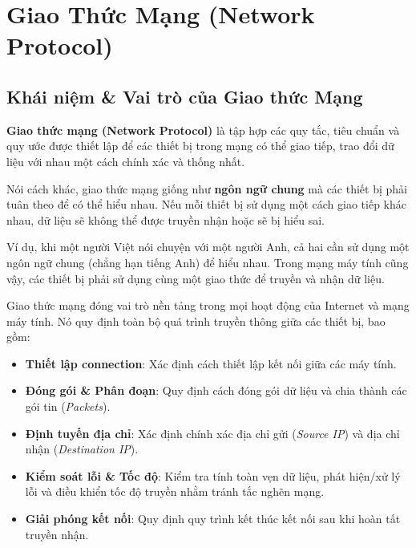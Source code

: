 \documentclass[11pt,oneside]{book}
\newcommand{\term}[1]{\textbf{\textcolor{primaryBlue}{#1}}}
\begin{document}
\section{Giao Thức Mạng (Network Protocol)}
\label{sec:protocols}

\subsection{Khái niệm \& Vai trò của Giao thức Mạng}

\term{Giao thức mạng (Network Protocol)} là tập hợp các quy tắc, tiêu chuẩn và quy ước được thiết lập để các thiết bị trong mạng có thể giao tiếp, trao đổi dữ liệu với nhau một cách chính xác và thống nhất.

Nói cách khác, giao thức mạng giống như \textbf{ngôn ngữ chung} mà các thiết bị phải tuân theo để có thể hiểu nhau. Nếu mỗi thiết bị sử dụng một cách giao tiếp khác nhau, dữ liệu sẽ không thể được truyền nhận hoặc sẽ bị hiểu sai.

Ví dụ, khi một người Việt nói chuyện với một người Anh, cả hai cần sử dụng một ngôn ngữ chung (chẳng hạn tiếng Anh) để hiểu nhau. Trong mạng máy tính cũng vậy, các thiết bị phải sử dụng cùng một giao thức để truyền và nhận dữ liệu.

Giao thức mạng đóng vai trò nền tảng trong mọi hoạt động của Internet và mạng máy tính. Nó quy định toàn bộ quá trình truyền thông giữa các thiết bị, bao gồm:
\begin{itemize}[leftmargin=2.2em, itemsep=2pt, parsep=0pt]
    \item \textbf{Thiết lập connection}: Xác định cách thiết lập kết nối giữa các máy tính.
    \item \textbf{Đóng gói \& Phân đoạn}: Quy định cách đóng gói dữ liệu và chia thành các gói tin (\textit{Packets}).
    \item \textbf{Định tuyến địa chỉ}: Xác định chính xác địa chỉ gửi (\textit{Source IP}) và địa chỉ nhận (\textit{Destination IP}).
    \item \textbf{Kiểm soát lỗi \& Tốc độ}: Kiểm tra tính toàn vẹn dữ liệu, phát hiện/xử lý lỗi và điều khiển tốc độ truyền nhằm tránh tắc nghẽn mạng.
    \item \textbf{Giải phóng kết nối}: Quy định quy trình kết thúc kết nối sau khi hoàn tất truyền nhận.
\end{itemize}
\end{document}
